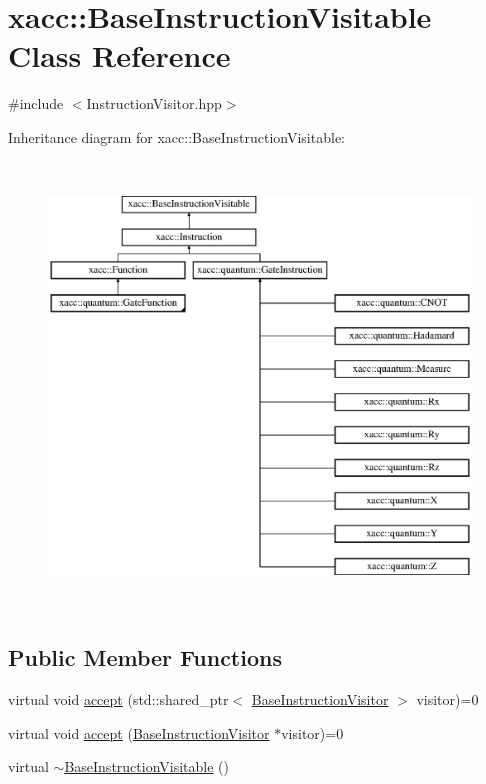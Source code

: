 \hypertarget{a00015}{}\section{xacc\+:\+:Base\+Instruction\+Visitable Class Reference}
\label{a00015}


{\ttfamily \#include $<$Instruction\+Visitor.\+hpp$>$}

Inheritance diagram for xacc\+:\+:Base\+Instruction\+Visitable\+:\begin{figure}[H]
\begin{center}
\leavevmode
\includegraphics[height=11.851852cm]{a00015}
\end{center}
\end{figure}
\subsection*{Public Member Functions}
\begin{DoxyCompactItemize}
\item 
virtual void \hyperlink{a00015_a4ae295a7f83d57c6f1f912adc90274ea}{accept} (std\+::shared\+\_\+ptr$<$ \hyperlink{a00016}{Base\+Instruction\+Visitor} $>$ visitor)=0
\item 
virtual void \hyperlink{a00015_ad6b9ad95c14580cc86ca87cd464262c3}{accept} (\hyperlink{a00016}{Base\+Instruction\+Visitor} $\ast$visitor)=0
\item 
virtual \hyperlink{a00015_a3a291d247b18ea7620dd8d97dfb595f4}{$\sim$\+Base\+Instruction\+Visitable} ()
\end{DoxyCompactItemize}
